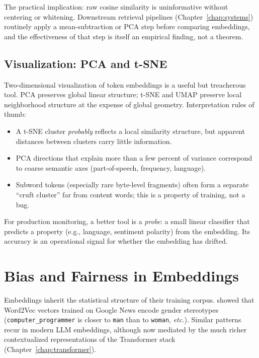 The practical implication: raw cosine similarity is uninformative
without centering or whitening. Downstream retrieval pipelines
(Chapter~\ref{chap:systems}) routinely apply a mean-subtraction or PCA step before
comparing embeddings, and the effectiveness of that step is itself an
empirical finding, not a theorem.

\subsection{Visualization: PCA and t-SNE}

Two-dimensional visualization of token embeddings is a useful but
treacherous tool. PCA preserves global linear structure; t-SNE and
UMAP preserve local neighborhood structure at the expense of global
geometry. Interpretation rules of thumb:
\begin{itemize}
  \item A t-SNE cluster \emph{probably} reflects a local similarity
        structure, but apparent distances between clusters carry
        little information.
  \item PCA directions that explain more than a few percent of
        variance correspond to coarse semantic axes
        (part-of-speech, frequency, language).
  \item Subword tokens (especially rare byte-level fragments) often
        form a separate ``cruft cluster'' far from content words;
        this is a property of training, not a bug.
\end{itemize}
For production monitoring, a better tool is a \emph{probe}: a small
linear classifier that predicts a property (e.g., language, sentiment
polarity) from the embedding. Its accuracy is an operational signal
for whether the embedding has drifted.

\section{Bias and Fairness in Embeddings}

Embeddings inherit the statistical structure of their training
corpus. \citet{bolukbasi2016man} showed that Word2Vec vectors
trained on Google News encode gender stereotypes
(\texttt{computer\_programmer} is closer to \texttt{man} than to
\texttt{woman}, \emph{etc.}). Similar patterns recur in modern LLM
embeddings, although now mediated by the much richer contextualized
representations of the Transformer stack (Chapter~\ref{chap:transformer}).

